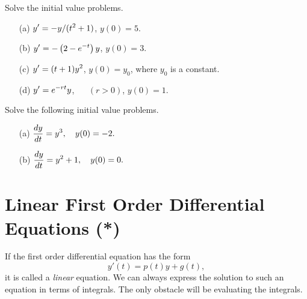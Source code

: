 \begin{exercises}
\begin{exercise}
Solve the initial value problems.
\begin{enumerate}
\item[(a)] $\displaystyle y' = -y/(t^2+1)$, \hspace{0.25cm} $y(0)=5$.
\item[(b)] $\displaystyle y' = -\left(2-e^{-t}\right)y$, \hspace{0.25cm} $y(0)=3$.
\item[(c)] $\displaystyle y' = (t+1)y^2$, \hspace{0.25cm} $y(0)=y_0$, where $y_0$ is
a constant.
\item[(d)] $\displaystyle y' = e^{-rt}y$, ~~ $(r > 0)$, \hspace{0.25cm}
                                       $y(0)=1$.
\end{enumerate}
\end{exercise}
\begin{exercise}
\label{ex:SolveFirstOrderAut}
Solve the following initial value problems.
\begin{enumerate}
\item[(a)] $\displaystyle \frac{dy}{dt} = y^3, \quad y(0)=-2.$
\item[(b)] $\displaystyle \frac{dy}{dt} = y^2+1, \quad y(0)=0.$
\end{enumerate}
\end{exercise}
\end{exercises}
%

\newpage

\section{Linear First Order Differential Equations (*)}
\label{sec:LinearFirstOrder}
If the first order differential equation has the form
\begin{equation}
    y'(t) = p(t) y + g(t),
\label{eqn:linear}
\end{equation}
it is called a \emph{linear} equation.
We can always express the solution to such an equation
in terms of integrals.  The only obstacle will be
evaluating the integrals.

